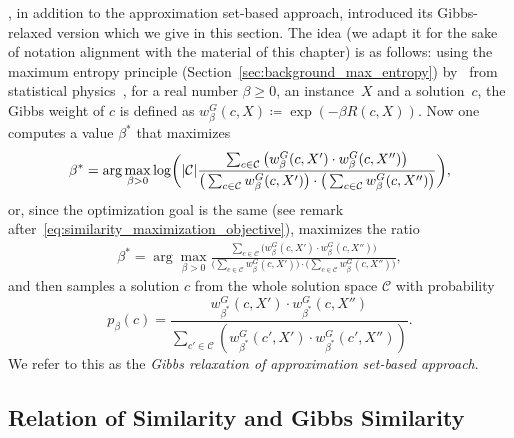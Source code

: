 %
%
\citet{conf/isit/Buhmann10}, in addition to the approximation set-based
approach, introduced its Gibbs-relaxed version which we give in this section.
The idea (we adapt it for the sake of notation alignment with the material of
this chapter) is as follows: using the maximum entropy principle
(Section~\ref{sec:background_max_entropy}) by~\citet{Jaynes82} from statistical
physics~\citep[see also][]{book/MezardM09}, for a real number $\beta \ge 0$, an
instance~$X$ and a solution~$c$, the Gibbs weight  of $c$
is defined as $w^G_\beta(c, X)
\coloneqq \exp(-\beta R(c, X))$. Now one computes a value $\beta^*$ that
maximizes
\begin{align}
  \label{eq:gibbs_realaxation}
  \beta^* = \arg \max_{\beta > 0}
    \log \biggl(|{\cal C}| \frac{\sum_{c\in\mathcal{C}}\big(w^G_\beta(c,X')\cdot w^G_\beta(c,X'')
      \big)}{\big(\sum_{c\in\mathcal{C}} w^G_\beta(c,X')\big)\cdot
      \big(\sum_{c\in\mathcal{C}} w^G_\beta(c,X'')\big)} \biggr),
\end{align}
%
or, since the optimization goal is the same (see remark
after~\eqref{eq:similarity_maximization_objective}), maximizes the ratio
\begin{align}
  \label{eq:gibbs_similarity_maximization_objective}
  \beta^* = \arg \max_{\beta > 0}
    \frac{\sum_{c\in\mathcal{C}}\big(w^G_\beta(c,X')\cdot w^G_\beta(c,X'')
      \big)}{\big(\sum_{c\in\mathcal{C}} w^G_\beta(c,X')\big)\cdot
      \big(\sum_{c\in\mathcal{C}} w^G_\beta(c,X'')\big)},
\end{align}
and then samples a solution $c$ from the whole solution space $\mathcal{C}$ with
probability 
\[
  p_\beta(c) = \frac{w^G_{\beta^*}(c,X')\cdot w^G_{\beta^*}(c,X'')}{\sum_{c'\in
\mathcal{C}} (w^G_{\beta^*}(c',X')\cdot w^G_{\beta^*}(c',X''))}.
\]
We refer to this as the \textit{Gibbs relaxation of approximation set-based
approach}.

\subsection{Relation of Similarity and Gibbs Similarity}

